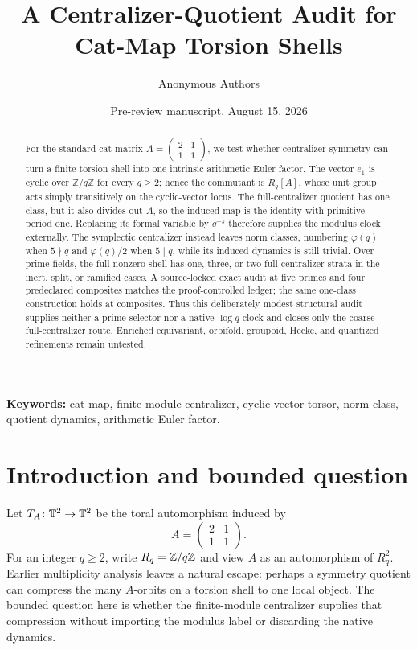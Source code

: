 \documentclass[11pt]{article}
\title{A Centralizer-Quotient Audit for Cat-Map Torsion Shells}
\author{Anonymous Authors}
\date{Pre-review manuscript, August 15, 2026}
\theoremstyle{definition}
\theoremstyle{remark}
\begin{document}
\maketitle

\begin{abstract}
For the standard cat matrix
\(A=\left(\begin{smallmatrix}2&1\\1&1\end{smallmatrix}\right)\), we test
whether centralizer symmetry can turn a finite torsion shell into one
intrinsic arithmetic Euler factor.  The vector \(e_1\) is cyclic over
\(\mathbb Z/q\mathbb Z\) for every \(q\ge2\); hence the commutant is
\(R_q[A]\), whose unit group acts simply transitively on the cyclic-vector
locus.  The full-centralizer quotient has one class, but it also divides out
\(A\), so the induced map is the identity with primitive period one.
Replacing its formal variable by \(q^{-s}\) therefore supplies the modulus
clock externally.  The symplectic centralizer instead leaves norm classes,
numbering \(\varphi(q)\) when \(5\nmid q\) and \(\varphi(q)/2\) when
\(5\mid q\), while its induced dynamics is still trivial.  Over prime
fields, the full nonzero shell has one, three, or two full-centralizer strata
in the inert, split, or ramified cases.  A source-locked exact audit at five
primes and four predeclared composites matches the proof-controlled ledger;
the same one-class construction holds at composites.  Thus this deliberately
modest structural audit supplies neither a prime selector nor a native
\(\log q\) clock and closes only the coarse full-centralizer route.  Enriched
equivariant, orbifold, groupoid, Hecke, and quantized refinements remain
untested.
\end{abstract}

\noindent\textbf{Keywords:} cat map, finite-module centralizer, cyclic-vector
torsor, norm class, quotient dynamics, arithmetic Euler factor.

\section{Introduction and bounded question}
\label{sec:introduction}

Let \(T_A\colon\mathbb{T}^{2}\to\mathbb{T}^{2}\) be the toral automorphism induced by
\begin{equation}
  A=\begin{pmatrix}2&1\\1&1\end{pmatrix}.
  \label{eq:cat-matrix}
\end{equation}
For an integer \(q\ge2\), write \(R_q=\mathbb{Z}/q\mathbb{Z}\) and view \(A\) as an
automorphism of \(R_q^2\).  Earlier multiplicity analysis leaves a natural
escape: perhaps a symmetry quotient can compress the many \(A\)-orbits on a
torsion shell to one local object.  The bounded question here is whether the
finite-module centralizer supplies that compression without importing the
modulus label or discarding the native dynamics.
\end{document}
